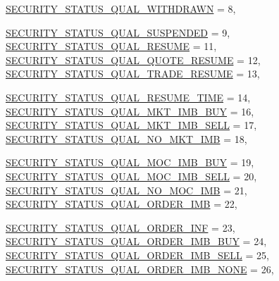 \begin{CompactItemize}
\hyperlink{namespaceWombat_2de6f22c731ba94169dc24b8054862b80b9ed353c650fc3bdd19b87a4eb801bc}{SECURITY\_\-STATUS\_\-QUAL\_\-WITHDRAWN} =  8, 
\par
\hyperlink{namespaceWombat_2de6f22c731ba94169dc24b8054862b8de0a70b1b3b984b7a2316922a7927b7c}{SECURITY\_\-STATUS\_\-QUAL\_\-SUSPENDED} =  9, 
\hyperlink{namespaceWombat_2de6f22c731ba94169dc24b8054862b8b0199cb1b796d76d0df6dab3c26d6d5e}{SECURITY\_\-STATUS\_\-QUAL\_\-RESUME} =  11, 
\hyperlink{namespaceWombat_2de6f22c731ba94169dc24b8054862b8d331466364041336d3bd84c8b8f38ff6}{SECURITY\_\-STATUS\_\-QUAL\_\-QUOTE\_\-RESUME} =  12, 
\hyperlink{namespaceWombat_2de6f22c731ba94169dc24b8054862b82e0e07fccc8bc217a76124fb6404290a}{SECURITY\_\-STATUS\_\-QUAL\_\-TRADE\_\-RESUME} =  13, 
\par
\hyperlink{namespaceWombat_2de6f22c731ba94169dc24b8054862b8384555bab3112418e0319b0b64dafbcc}{SECURITY\_\-STATUS\_\-QUAL\_\-RESUME\_\-TIME} =  14, 
\hyperlink{namespaceWombat_2de6f22c731ba94169dc24b8054862b80137962a505567e63a02c8edb4e69e81}{SECURITY\_\-STATUS\_\-QUAL\_\-MKT\_\-IMB\_\-BUY} =  16, 
\hyperlink{namespaceWombat_2de6f22c731ba94169dc24b8054862b886fbb61b562d7040853ead355b4ed49f}{SECURITY\_\-STATUS\_\-QUAL\_\-MKT\_\-IMB\_\-SELL} =  17, 
\hyperlink{namespaceWombat_2de6f22c731ba94169dc24b8054862b8c6f70afa8fdc73dfb060ccdbfb656068}{SECURITY\_\-STATUS\_\-QUAL\_\-NO\_\-MKT\_\-IMB} =  18, 
\par
\hyperlink{namespaceWombat_2de6f22c731ba94169dc24b8054862b8ee9a4b60579ff04a43c1b622f6d0d46a}{SECURITY\_\-STATUS\_\-QUAL\_\-MOC\_\-IMB\_\-BUY} =  19, 
\hyperlink{namespaceWombat_2de6f22c731ba94169dc24b8054862b82dac34c7d52025206c7c20c0a746d5dc}{SECURITY\_\-STATUS\_\-QUAL\_\-MOC\_\-IMB\_\-SELL} =  20, 
\hyperlink{namespaceWombat_2de6f22c731ba94169dc24b8054862b833f53f2c2d08336b644593c53b54133f}{SECURITY\_\-STATUS\_\-QUAL\_\-NO\_\-MOC\_\-IMB} =  21, 
\hyperlink{namespaceWombat_2de6f22c731ba94169dc24b8054862b849b53f20f9cadaeca2af62da9a543262}{SECURITY\_\-STATUS\_\-QUAL\_\-ORDER\_\-IMB} =  22, 
\par
\hyperlink{namespaceWombat_2de6f22c731ba94169dc24b8054862b89f5145dbc14bbc9e79f550e68ece276c}{SECURITY\_\-STATUS\_\-QUAL\_\-ORDER\_\-INF} =  23, 
\hyperlink{namespaceWombat_2de6f22c731ba94169dc24b8054862b84cc479413527a623f0bd7eb8189e009b}{SECURITY\_\-STATUS\_\-QUAL\_\-ORDER\_\-IMB\_\-BUY} =  24, 
\hyperlink{namespaceWombat_2de6f22c731ba94169dc24b8054862b8455b85dcbcc605a02b735a4276e60822}{SECURITY\_\-STATUS\_\-QUAL\_\-ORDER\_\-IMB\_\-SELL} =  25, 
\hyperlink{namespaceWombat_2de6f22c731ba94169dc24b8054862b850c85079cfe03c8f46a6df3d2b8ebd8d}{SECURITY\_\-STATUS\_\-QUAL\_\-ORDER\_\-IMB\_\-NONE} =  26, 

\end{CompactItemize}
